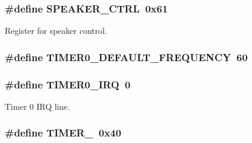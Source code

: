 \subsubsection[{\texorpdfstring{S\+P\+E\+A\+K\+E\+R\+\_\+\+C\+T\+RL}{SPEAKER_CTRL}}]{\setlength{\rightskip}{0pt plus 5cm}\#define S\+P\+E\+A\+K\+E\+R\+\_\+\+C\+T\+RL~0x61}\hypertarget{group__i8254_ga51b3a5e3d4811ca063fe25e35560ab40}{}\label{group__i8254_ga51b3a5e3d4811ca063fe25e35560ab40}


Register for speaker control. 

\subsubsection[{\texorpdfstring{T\+I\+M\+E\+R0\+\_\+\+D\+E\+F\+A\+U\+L\+T\+\_\+\+F\+R\+E\+Q\+U\+E\+N\+CY}{TIMER0_DEFAULT_FREQUENCY}}]{\setlength{\rightskip}{0pt plus 5cm}\#define T\+I\+M\+E\+R0\+\_\+\+D\+E\+F\+A\+U\+L\+T\+\_\+\+F\+R\+E\+Q\+U\+E\+N\+CY~60}\hypertarget{group__i8254_ga12949f80c4101a3d1f40ebfc202b4914}{}\label{group__i8254_ga12949f80c4101a3d1f40ebfc202b4914}
\subsubsection[{\texorpdfstring{T\+I\+M\+E\+R0\+\_\+\+I\+RQ}{TIMER0_IRQ}}]{\setlength{\rightskip}{0pt plus 5cm}\#define T\+I\+M\+E\+R0\+\_\+\+I\+RQ~0}\hypertarget{group__i8254_ga30bf84c312af248cb81bb224e09f9ba8}{}\label{group__i8254_ga30bf84c312af248cb81bb224e09f9ba8}


Timer 0 I\+RQ line. 

\subsubsection[{\texorpdfstring{T\+I\+M\+E\+R\+\_\+0}{TIMER_0}}]{\setlength{\rightskip}{0pt plus 5cm}\#define T\+I\+M\+E\+R\+\_~0x40}\hypertarget{group__i8254_gacc9ff9df4a9674a1ce9ba08fc4a4679e}{}\label{group__i8254_gacc9ff9df4a9674a1ce9ba08fc4a4679e}


